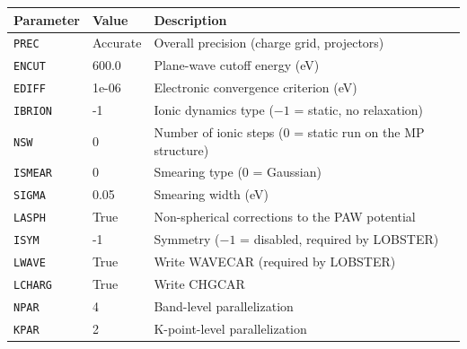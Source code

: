 \begin{tabular}{@{}l l p{7.5cm}@{}}
\toprule
Parameter & Value & Description \\
\midrule
\texttt{PREC} & Accurate & Overall precision (charge grid, projectors) \\
\texttt{ENCUT} & 600.0 & Plane-wave cutoff energy (eV) \\
\texttt{EDIFF} & 1e-06 & Electronic convergence criterion (eV) \\
\texttt{IBRION} & -1 & Ionic dynamics type ($-1$ = static, no relaxation) \\
\texttt{NSW} & 0 & Number of ionic steps (0 = static run on the MP structure) \\
\texttt{ISMEAR} & 0 & Smearing type ($0$ = Gaussian) \\
\texttt{SIGMA} & 0.05 & Smearing width (eV) \\
\texttt{LASPH} & True & Non-spherical corrections to the PAW potential \\
\texttt{ISYM} & -1 & Symmetry ($-1$ = disabled, required by LOBSTER) \\
\texttt{LWAVE} & True & Write WAVECAR (required by LOBSTER) \\
\texttt{LCHARG} & True & Write CHGCAR \\
\texttt{NPAR} & 4 & Band-level parallelization \\
\texttt{KPAR} & 2 & K-point-level parallelization \\
\bottomrule
\end{tabular}